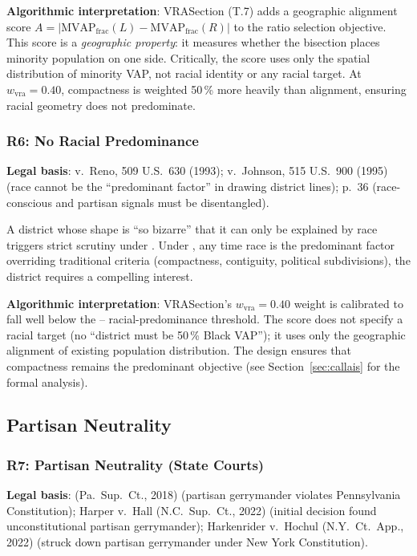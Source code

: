 \textbf{Algorithmic interpretation}: VRASection (T.7) adds a geographic alignment
score $A = |\text{MVAP}_\text{frac}(L) - \text{MVAP}_\text{frac}(R)|$ to the
ratio selection objective.
This score is a \emph{geographic property}: it measures whether the bisection
places minority population on one side.
Critically, the score uses only the spatial distribution of minority VAP,
not racial identity or any racial target.
At $w_\text{vra} = 0.40$, compactness is weighted 50\,\% more heavily than
alignment, ensuring racial geometry does not predominate.

\subsubsection*{R6: No Racial Predominance}

\textbf{Legal basis}: \shaw{} v.\ Reno, 509 U.S.\ 630 (1993); \miller{} v.\
Johnson, 515 U.S.\ 900 (1995) (race cannot be the ``predominant factor'' in
drawing district lines); \callais{} p.~36 (race-conscious and partisan signals
must be disentangled).

A district whose shape is ``so bizarre'' that it can only be explained by race
triggers strict scrutiny under \shaw{}.
Under \miller{}, any time race is the predominant factor overriding traditional
criteria (compactness, contiguity, political subdivisions), the district
requires a compelling interest.

\textbf{Algorithmic interpretation}: VRASection's $w_\text{vra} = 0.40$ weight
is calibrated to fall well below the \shaw{}--\miller{} racial-predominance
threshold.
The score does not specify a racial target (no ``district must be 50\,\% Black VAP'');
it uses only the geographic alignment of existing population distribution.
The design ensures that compactness remains the predominant objective
(see Section~\ref{sec:callais} for the formal analysis).

\subsection{Partisan Neutrality}

\subsubsection*{R7: Partisan Neutrality (State Courts)}

\textbf{Legal basis}: \lwvpa{} (Pa.\ Sup.\ Ct., 2018) (partisan gerrymander
violates Pennsylvania Constitution); Harper v.\ Hall (N.C.\ Sup.\ Ct., 2022)
(initial decision found unconstitutional partisan gerrymander); Harkenrider v.\
Hochul (N.Y.\ Ct.\ App., 2022) (struck down partisan gerrymander under
New York Constitution).

